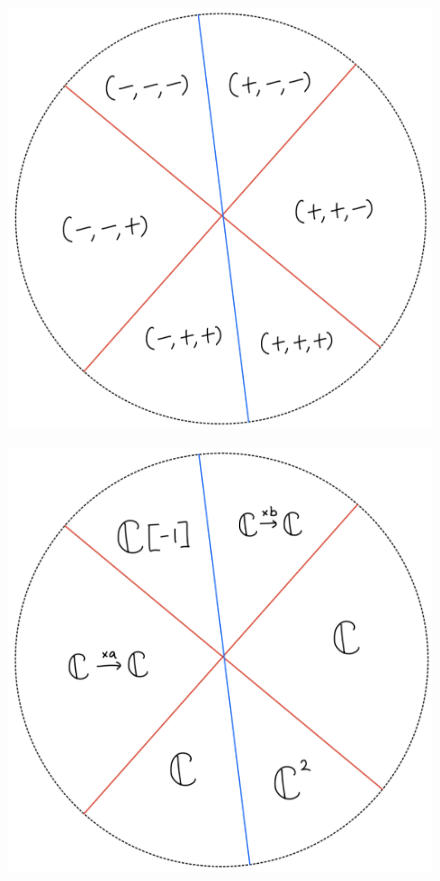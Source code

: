 \begin{figure}[H]
    \centering
    \includegraphics[scale = 0.45]{diagrams/lemma4/24.png}
    \caption{}
    \label{fig:your-label}
\end{figure}
\begin{figure}[H]
    \centering
    \includegraphics[scale = 0.45]{diagrams/lemma4/25.png}
    \caption{}
    \label{fig:your-label}
\end{figure}
